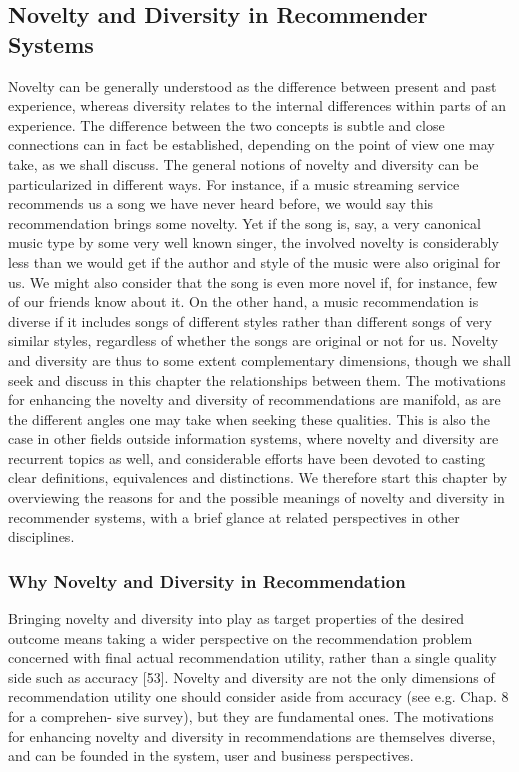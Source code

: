\subsection{Novelty and Diversity in Recommender Systems}

Novelty can be generally understood as the difference between present and past experience, whereas diversity relates to the internal differences within parts of an experience. The difference between the two concepts is subtle and close connections can in fact be established, depending on the point of view one may take, as we shall discuss. The general notions of novelty and diversity can be particularized in different ways. For instance, if a music streaming service recommends us a song we have never heard before, we would say this recommendation brings some novelty. Yet if the song is, say, a very canonical music type by some very well known singer, the involved novelty is considerably less than we would get if the author and style of the music were also original for us. We might also consider that the song is even more novel if, for instance, few of our friends know about it. On the other hand, a music recommendation is diverse if it includes songs of different styles rather than different songs of very similar styles, regardless of whether the songs are original or not for us. Novelty and diversity are thus to some extent complementary dimensions, though we shall seek and discuss in this chapter the relationships between them.
The motivations for enhancing the novelty and diversity of recommendations are manifold, as are the different angles one may take when seeking these qualities. This is also the case in other fields outside information systems, where novelty and diversity are recurrent topics as well, and considerable efforts have been devoted to casting clear definitions, equivalences and distinctions. We therefore start this chapter by overviewing the reasons for and the possible meanings of novelty and diversity in recommender systems, with a brief glance at related perspectives in other disciplines.

\subsubsection{Why Novelty and Diversity in Recommendation}

Bringing novelty and diversity into play as target properties of the desired outcome means taking a wider perspective on the recommendation problem concerned with final actual recommendation utility, rather than a single quality side such as accuracy [53]. Novelty and diversity are not the only dimensions of recommendation utility one should consider aside from accuracy (see e.g. Chap. 8 for a comprehen- sive survey), but they are fundamental ones. The motivations for enhancing novelty and diversity in recommendations are themselves diverse, and can be founded in the system, user and business perspectives.


